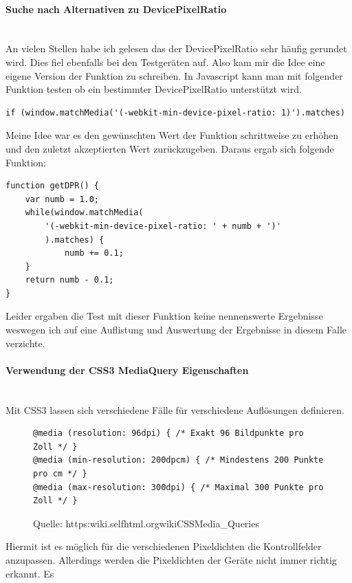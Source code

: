 \paragraph{Suche nach Alternativen zu DevicePixelRatio}
\mbox{}\\
An vielen Stellen habe ich gelesen das der DevicePixelRatio sehr häufig gerundet wird. Dies fiel ebenfalls bei den Testgeräten auf.
\newline
Also kam mir die Idee eine eigene Version der Funktion zu schreiben. In Javascript kann man mit folgender Funktion testen ob ein bestimmter DevicePixelRatio unterstützt wird.
\begin{lstlisting}
if (window.matchMedia('(-webkit-min-device-pixel-ratio: 1)').matches) 
\end{lstlisting}
Meine Idee war es den gewünschten Wert der Funktion schrittweise zu erhöhen und den zuletzt akzeptierten Wert zurückzugeben.
\newline
Daraus ergab sich folgende Funktion:
\begin{lstlisting}
function getDPR() {
    var numb = 1.0;
    while(window.matchMedia(
    	'(-webkit-min-device-pixel-ratio: ' + numb + ')'
    	).matches) {
        	numb += 0.1;
    }
    return numb - 0.1;
}
\end{lstlisting}
Leider ergaben die Test mit dieser Funktion keine nennenswerte Ergebnisse weswegen ich auf eine Auflistung und Auswertung der Ergebnisse in diesem Falle verzichte.
\paragraph{Verwendung der CSS3 MediaQuery Eigenschaften}
\mbox{}\\
Mit CSS3 lassen sich verschiedene Fälle für verschiedene Auflösungen definieren.
\begin{figure}[ht]
	\centering
	\begin{lstlisting}
@media (resolution: 96dpi) { /* Exakt 96 Bildpunkte pro Zoll */ }
@media (min-resolution: 200dpcm) { /* Mindestens 200 Punkte pro cm */ }
@media (max-resolution: 300dpi) { /* Maximal 300 Punkte pro Zoll */ }
	\end{lstlisting}
	\caption{Quelle: https:\/\/wiki.selfhtml.org\/wiki\/CSS\/Media\_Queries}
	\label{figx}
\end{figure}
\newline
Hiermit ist es möglich für die verschiedenen Pixeldichten die Kontrollfelder anzupassen. Allerdings werden die Pixeldichten der Geräte nicht immer richtig erkannt. Es 
\newpage
